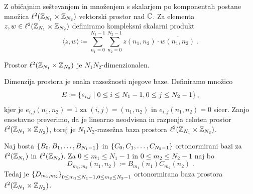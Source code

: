 Z običajnim seštevanjem in množenjem s skalarjem po komponentah postane množica $\ell^2(\mathbb Z_{N_1} \times \mathbb Z_{N_2})$ vektorski prostor nad $\mathbb C$. Za elementa $z, w \in \ell^2(\mathbb Z_{N_1} \times \mathbb Z_{N_2})$ definiramo kompleksni skalarni produkt
%
\begin{equation}\label{eq:defSP}
  \langle z, w\rangle \coloneqq \sum_{n_1 = 0}^{N_1 - 1} \sum_{n_2 = 0}^{N_2 - 1} z(n_1, n_2) \cdot \overline{w(n_1, n_2)} \;.
\end{equation}
%
\begin{trditev}
Prostor $\ell^2(\mathbb Z_{N_1} \times \mathbb Z_{N_2})$ je $N_1 N_2$-dimenzionalen.
\end{trditev}
%
\begin{dokaz}
Dimenzija prostora je enaka razsežnosti njegove baze. Definiramo množico
$$E \coloneqq \left\{e_{i,j} \mid 0 \leq i \leq N_1-1, 0 \leq j \leq N_2-1\right\},$$
kjer je $e_{i,j}(n_1, n_2) = 1$ za $(i,j) = (n_1, n_2)$ in $e_{i,j}(n_1, n_2) = 0$ sicer. Zanjo enostavno preverimo, da je linearno neodvisna in razpenja celoten prostor $\ell^2(\mathbb Z_{N_1} \times \mathbb Z_{N_2})$, torej je $N_1N_2$-razsežna baza prostora $\ell^2(\mathbb Z_{N_1} \times \mathbb Z_{N_2})$.
\end{dokaz}
%
\begin{izrek}
Naj bosta $\left\{B_0, B_1, \ldots, B_{N_1 - 1}\right\}$ in $\left\{C_0, C_1, \ldots, C_{N_2 - 1}\right\}$ ortonormirani bazi za $\ell^2(\mathbb Z_{N_1})$ in $\ell^2(\mathbb Z_{N_2})$. Za $0 \leq m_1 \leq N_1 - 1$ in $0 \leq m_2 \leq N_2 - 1$ naj bo
$$D_{m_1, m_2}(n_1, n_2) \coloneqq B_{m_1}(n_1)C_{m_2}(n_2) \;.$$
Tedaj je $\left\{D_{m_1, m_2}\right\}_{0 \leq m_1 \leq N_1 - 1, 0 \leq m_2 \leq N_2 - 1}$ ortonormirana baza prostora $\ell^2(\mathbb Z_{N_1} \times \mathbb Z_{N_2})$.
\end{izrek}
%

